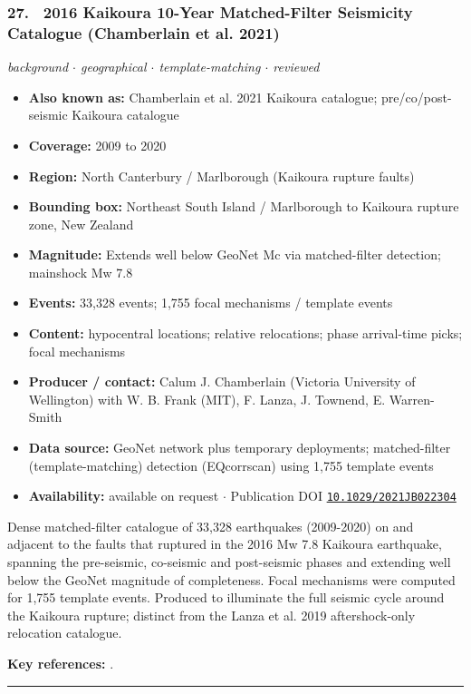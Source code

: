 \documentclass[10pt,a4paper]{article}
\newcommand{\catentryrule}{\par\vspace{3pt}\noindent\textcolor{rulegrey}{\rule{\linewidth}{0.3pt}}\par\vspace{5pt}}
\newcommand{\kv}[2]{\item \textbf{#1:} #2}
\begin{document}
\subsubsection*{\hypertarget{c:27}{27.}~ 2016 Kaikoura 10-Year Matched-Filter Seismicity Catalogue (Chamberlain et al. 2021)}
{\small\itshape background $\cdot$ geographical $\cdot$ template-matching $\cdot$ reviewed}\par\vspace{2pt}
\begin{itemize}[leftmargin=1.3em,itemsep=0.6pt,topsep=1pt,parsep=0pt]
\kv{Also known as}{Chamberlain et al. 2021 Kaikoura catalogue; pre/co/post-seismic Kaikoura catalogue}
\kv{Coverage}{2009 to 2020}
\kv{Region}{North Canterbury / Marlborough (Kaikoura rupture faults)}
\kv{Bounding box}{Northeast South Island / Marlborough to Kaikoura rupture zone, New Zealand}
\kv{Magnitude}{Extends well below GeoNet Mc via matched-filter detection; mainshock Mw 7.8}
\kv{Events}{33,328 events; 1,755 focal mechanisms / template events}
\kv{Content}{hypocentral locations; relative relocations; phase arrival-time picks; focal mechanisms}
\kv{Producer / contact}{Calum J. Chamberlain (Victoria University of Wellington) with W. B. Frank (MIT), F. Lanza, J. Townend, E. Warren-Smith}
\kv{Data source}{GeoNet network plus temporary deployments; matched-filter (template-matching) detection (EQcorrscan) using 1,755 template events}
\kv{Availability}{available on request $\cdot$ Publication DOI \href{https://doi.org/10.1029/2021JB022304}{\nolinkurl{10.1029/2021JB022304}}}
\end{itemize}
\par\vspace{2pt}Dense matched-filter catalogue of 33,328 earthquakes (2009-2020) on and adjacent to the faults that ruptured in the 2016 Mw 7.8 Kaikoura earthquake, spanning the pre-seismic, co-seismic and post-seismic phases and extending well below the GeoNet magnitude of completeness. Focal mechanisms were computed for 1,755 template events. Produced to illuminate the full seismic cycle around the Kaikoura rupture; distinct from the Lanza et al. 2019 aftershock-only relocation catalogue.
\par\vspace{2pt}\textbf{Key references:} \cite{Chamberlain2021}.
\catentryrule
\end{document}
